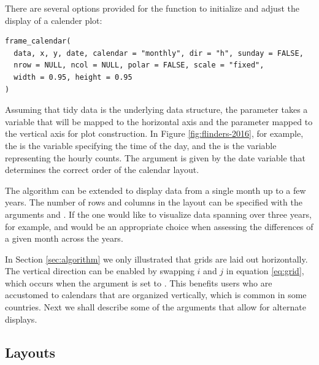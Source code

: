 \documentclass[article]{jss}
\theoremstyle{definition}
\theoremstyle{definition}
\theoremstyle{remark}
\begin{document}
\label{sec:opt}

There are several options provided for the 
function to initialize and adjust the display of a calender plot:

\begin{verbatim}
frame_calendar(
  data, x, y, date, calendar = "monthly", dir = "h", sunday = FALSE, 
  nrow = NULL, ncol = NULL, polar = FALSE, scale = "fixed",
  width = 0.95, height = 0.95
)
\end{verbatim}

Assuming that tidy data \citep{wickham2014tidy} is the underlying data
structure, the parameter  takes a variable that will be mapped
to the horizontal axis and the parameter  mapped to the vertical
axis for plot construction. In Figure \ref{fig:flinders-2016}, for
example, the  is the variable specifying the time of the day,
and the  is the variable representing the hourly counts. The
 argument is given by the date variable that determines the
correct order of the calendar layout.

The algorithm can be extended to display data from a single month up to
a few years. The number of rows and columns in the layout can be
specified with the arguments  and . If the one
would like to visualize data spanning over three years, for example,
 and  would be an appropriate choice when
assessing the differences of a given month across the years.

In Section \ref{sec:algorithm} we only illustrated that grids are laid
out horizontally. The vertical direction can be enabled by swapping
\(i\) and \(j\) in equation \ref{eq:grid}, which occurs when the
argument  is set to . This benefits users who are
accustomed to calendars that are organized vertically, which is common
in some countries. Next we shall describe some of the arguments that
allow for alternate displays.

\subsection{Layouts}\label{layouts}
\end{document}
